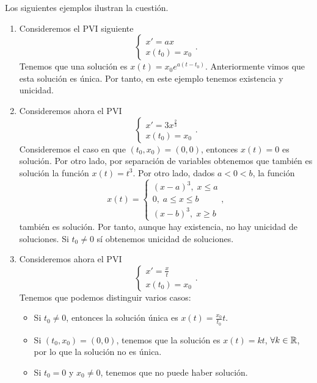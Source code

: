 \begin{eg}
	Los siguientes ejemplos ilustran la cuestión.
	\begin{enumerate}
	\item Consideremos el PVI siguiente
\[
\begin{cases}
x' = a x \\
x\left(t_{0}\right)=x_{0}
\end{cases}
.\]
Tenemos que una solución es $\displaystyle x\left(t\right)=x_{0}e^{a\left(t-t_{0}\right)} $. Anteriormente vimos que esta solución es única. Por tanto, en este ejemplo tenemos existencia y unicidad.
\item Consideremos ahora el PVI
	\[
	\begin{cases}
	x' = 3x^{\frac{2}{3}} \\
	x\left(t_{0}\right)=x_{0}
	\end{cases}
	.\]
	Consideremos el caso en que $\displaystyle \left(t_{0}, x_{0}\right)=\left(0,0\right) $, entonces $\displaystyle x\left(t\right)=0 $ es solución. Por otro lado, por separación de variables obtenemos que también es solución la función $\displaystyle x\left(t\right)=t ^{3} $. Por otro lado, dados $\displaystyle a < 0 < b $, la función
	\[x\left(t\right) =
	\begin{cases}
		\left(x-a\right)^{3}, \; x \leq a \\
		0, \; a \leq x \leq b \\
		\left(x-b\right)^{3}, \; x \geq b
	\end{cases}
	,\]
	también es solución. 
	Por tanto, aunque hay existencia, no hay unicidad de soluciones. Si $\displaystyle t_{0}\neq 0 $ sí obtenemos unicidad de soluciones.
\item Consideremos ahora el PVI
	\[
	\begin{cases}
	x' = \frac{x}{t} \\
	x\left(t_{0}\right)=x_{0}
	\end{cases}
	.\]
Tenemos que podemos distinguir varios casos:
\begin{itemize}
\item Si $\displaystyle t_{0}\neq 0 $, entonces la solución única es $\displaystyle x\left(t\right)=\frac{x_{0}}{t_{0}}t $. 
\item Si $\displaystyle \left(t_{0}, x_{0}\right)=\left(0,0\right) $, tenemos que la solución es $\displaystyle x\left(t\right)=kt $, $\displaystyle \forall k \in \mathbb{R} $, por lo que la solución no es única. 
\item Si $\displaystyle t_{0}=0 $ y $\displaystyle x_{0}\neq 0 $, tenemos que no puede haber solución.
\end{itemize}
	\end{enumerate}
\end{eg}
